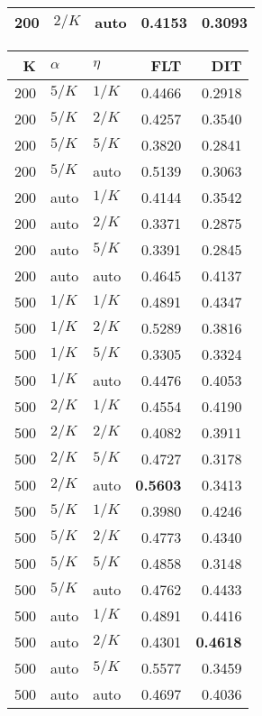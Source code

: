 \begin{table}
\begin{spacing}{1.2}
{\begin{tabular}{rll|rr}
 200 &  $2/K$ &   auto &           0.4153 & 0.3093 \\
\bottomrule
\end{tabular}
} \hfill \parbox{.45\linewidth}{\centering \begin{tabular}{rll|rr}
\toprule
   K &  $\alpha$ &    $\eta$ & FLT &       DIT \\
\midrule
 200 &  $5/K$ &  $1/K$ &           0.4466 &       0.2918 \\
 200 &  $5/K$ &  $2/K$ &           0.4257 &       0.3540 \\
 200 &  $5/K$ &  $5/K$ &           0.3820 &       0.2841 \\
 200 &  $5/K$ &   auto &           0.5139 &       0.3063 \\
 200 &   auto &  $1/K$ &           0.4144 &       0.3542 \\
 200 &   auto &  $2/K$ &           0.3371 &       0.2875 \\
 200 &   auto &  $5/K$ &           0.3391 &       0.2845 \\
 200 &   auto &   auto &           0.4645 &       0.4137 \\
 500 &  $1/K$ &  $1/K$ &           0.4891 &       0.4347 \\
 500 &  $1/K$ &  $2/K$ &           0.5289 &       0.3816 \\
 500 &  $1/K$ &  $5/K$ &           0.3305 &       0.3324 \\
 500 &  $1/K$ &   auto &           0.4476 &       0.4053 \\
 500 &  $2/K$ &  $1/K$ &           0.4554 &       0.4190 \\
 500 &  $2/K$ &  $2/K$ &           0.4082 &       0.3911 \\
 500 &  $2/K$ &  $5/K$ &           0.4727 &       0.3178 \\
 500 &  $2/K$ &   auto &     {\bf 0.5603} &       0.3413 \\
 500 &  $5/K$ &  $1/K$ &           0.3980 &       0.4246 \\
 500 &  $5/K$ &  $2/K$ &           0.4773 &       0.4340 \\
 500 &  $5/K$ &  $5/K$ &           0.4858 &       0.3148 \\
 500 &  $5/K$ &   auto &           0.4762 &       0.4433 \\
 500 &   auto &  $1/K$ &           0.4891 &       0.4416 \\
 500 &   auto &  $2/K$ &           0.4301 & {\bf 0.4618} \\
 500 &   auto &  $5/K$ &           0.5577 &       0.3459 \\
 500 &   auto &   auto &           0.4697 &       0.4036 \\
\bottomrule
\end{tabular}
}
\end{spacing}
\end{table}

